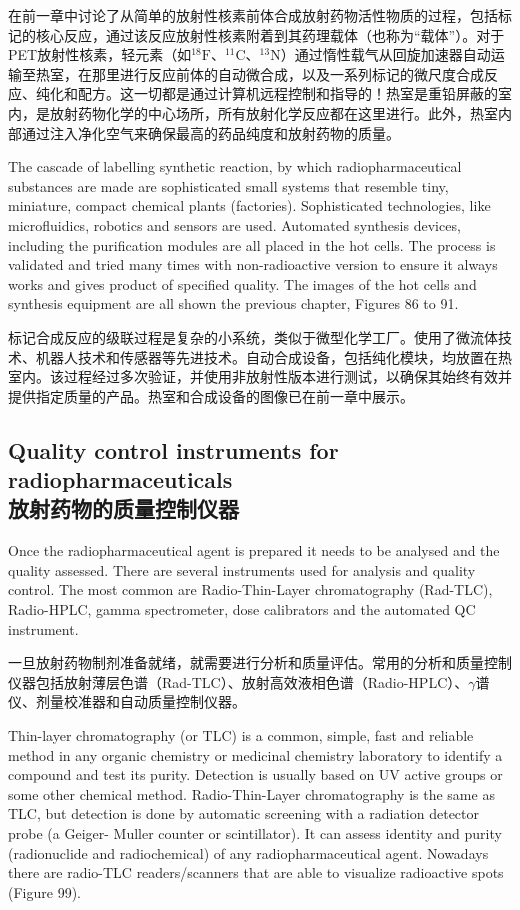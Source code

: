 \documentclass[dvipsnames, svgnames,a4paper,11pt]{article}
\begin{document}
在前一章中讨论了从简单的放射性核素前体合成放射药物活性物质的过程，包括标记的核心反应，通过该反应放射性核素附着到其药理载体（也称为“载体”）。对于PET放射性核素，轻元素（如${}^{18}\mathrm{F}$、${}^{11}\mathrm{C}$、${}^{13}\mathrm{N}$）通过惰性载气从回旋加速器自动运输至热室，在那里进行反应前体的自动微合成，以及一系列标记的微尺度合成反应、纯化和配方。这一切都是通过计算机远程控制和指导的！热室是重铅屏蔽的室内，是放射药物化学的中心场所，所有放射化学反应都在这里进行。此外，热室内部通过注入净化空气来确保最高的药品纯度和放射药物的质量。



The cascade of labelling synthetic reaction, by which radiopharmaceutical
substances are made are sophisticated small systems that resemble tiny, miniature,
compact chemical plants (factories). Sophisticated technologies, like microfluidics,
robotics and sensors are used. Automated synthesis devices, including the
purification modules are all placed in the hot cells. The process is validated and tried
many times with non-radioactive version to ensure it always works and gives product
of specified quality. The images of the hot cells and synthesis equipment are all
shown the previous chapter, Figures 86 to 91.

标记合成反应的级联过程是复杂的小系统，类似于微型化学工厂。使用了微流体技术、机器人技术和传感器等先进技术。自动合成设备，包括纯化模块，均放置在热室内。该过程经过多次验证，并使用非放射性版本进行测试，以确保其始终有效并提供指定质量的产品。热室和合成设备的图像已在前一章中展示。

\subsection{Quality control instruments for radiopharmaceuticals \\放射药物的质量控制仪器}


Once the radiopharmaceutical agent is prepared it needs to be analysed and the
quality assessed. There are several instruments used for analysis and quality control.
The most common are Radio-Thin-Layer chromatography (Rad-TLC), Radio-HPLC,
gamma spectrometer, dose calibrators and the automated QC instrument.

一旦放射药物制剂准备就绪，就需要进行分析和质量评估。常用的分析和质量控制仪器包括放射薄层色谱（Rad-TLC）、放射高效液相色谱（Radio-HPLC）、$\gamma$谱仪、剂量校准器和自动质量控制仪器。


Thin-layer chromatography (or TLC) is a common, simple, fast and reliable method
in any organic chemistry or medicinal chemistry laboratory to identify a compound and test its purity. Detection is usually based on UV active groups or some other
chemical method. Radio-Thin-Layer chromatography is the same as TLC, but
detection is done by automatic screening with a radiation detector probe (a Geiger-
Muller counter or scintillator). It can assess identity and purity (radionuclide and
radiochemical) of any radiopharmaceutical agent. Nowadays there are radio-TLC
readers/scanners that are able to visualize radioactive spots (Figure 99).
\end{document}
